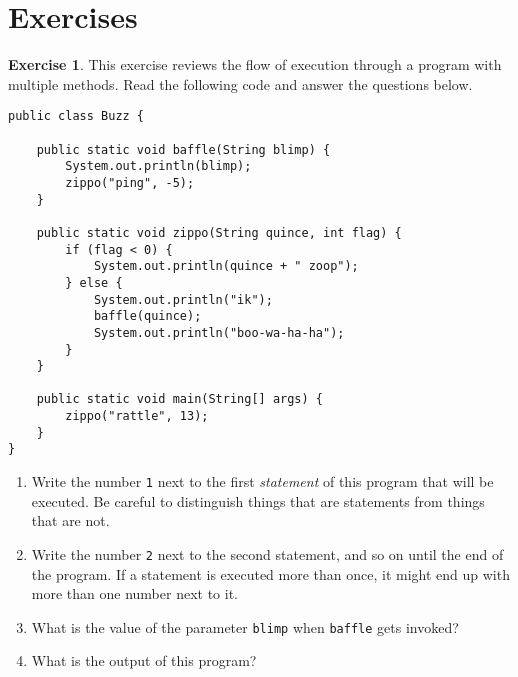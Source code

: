 \documentclass[12pt]{book}
\theoremstyle{definition}
\newtheorem{excz}{Exercise}[chapter]
\newenvironment{exercise}{\bigskip\begin{excz}\mbox{}}{\end{excz}}
\begin{document}
\section{Exercises}

\begin{exercise}

This exercise reviews the flow of execution through a program
with multiple methods.  Read the following code and answer the
questions below.

\begin{lstlisting}
public class Buzz {

    public static void baffle(String blimp) {
        System.out.println(blimp);
        zippo("ping", -5);
    }

    public static void zippo(String quince, int flag) {
        if (flag < 0) {
            System.out.println(quince + " zoop");
        } else {
            System.out.println("ik");
            baffle(quince);
            System.out.println("boo-wa-ha-ha");
        } 
    }

    public static void main(String[] args) {
        zippo("rattle", 13);
    }
}
\end{lstlisting}

\begin{enumerate}

\item Write the number {\tt 1} next to the first {\em statement}
of this program that will be executed.  Be careful to distinguish
things that are statements from things that are not.

\item Write the number {\tt 2} next to the second statement, and so on
until the end of the program.  If a statement is executed more than
once, it might end up with more than one number next to it.

\item What is the value of the parameter {\tt blimp} when {\tt baffle}
gets invoked?

\item What is the output of this program?

\end{enumerate}
\end{exercise}
\end{document}
